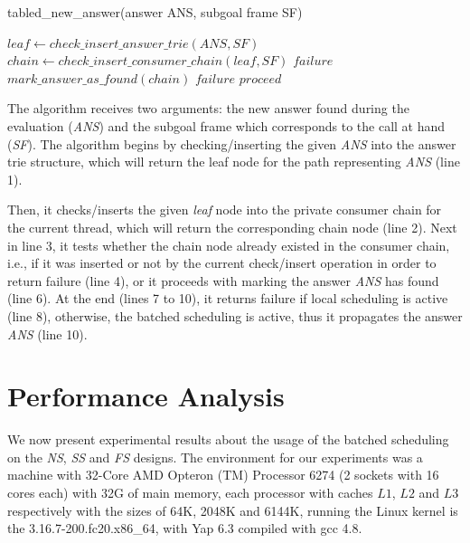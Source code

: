 \documentclass{llncs}
\begin{document}
\begin{algorithm} [ht]
\caption{tabled\_new\_answer(answer ANS, subgoal frame SF)}
\begin{algorithmic}[1]
  \STATE $leaf \gets check\_insert\_answer\_trie(ANS, SF)$
  \STATE $chain \gets check\_insert\_consumer\_chain(leaf, SF)$
    \RETURN $failure$
    \STATE $mark\_answer\_as\_found(chain)$
      \RETURN $failure$
      \RETURN $proceed$
    \ENDIF
  \ENDIF  
\end{algorithmic}
\label{alg_table_new_answer_batched}
\end{algorithm}

The algorithm receives two arguments: the new answer found during the
evaluation (\emph{ANS}) and the subgoal frame which corresponds to the
call at hand (\emph{SF}). The algorithm begins by checking/inserting
the given \emph{ANS} into the answer trie structure, which will return
the leaf node for the path representing \emph{ANS} (line 1).

Then, it checks/inserts the given \emph{leaf} node into the private
consumer chain for the current thread, which will return the
corresponding chain node (line 2). Next in line 3, it tests whether
the chain node already existed in the consumer chain, i.e., if it was
inserted or not by the current check/insert operation in order to
return failure (line 4), or it proceeds with marking the answer
\emph{ANS} has found (line 6). At the end (lines 7 to 10), it returns
failure if local scheduling is active (line 8), otherwise, the batched
scheduling is active, thus it propagates the answer \emph{ANS} (line
10).

\section{Performance Analysis}

We now present experimental results about the usage of the batched
scheduling on the \emph{NS}, \emph{SS} and \emph{FS} designs. The
environment for our experiments was a machine with 32-Core AMD Opteron
(TM) Processor 6274 (2 sockets with 16 cores each) with 32G of main
memory, each processor with caches $L1$, $L2$ and $L3$ respectively
with the sizes of 64K, 2048K and 6144K, running the Linux kernel is
the 3.16.7-200.fc20.x86\_64, with Yap 6.3 compiled with gcc 4.8.
\end{document}
